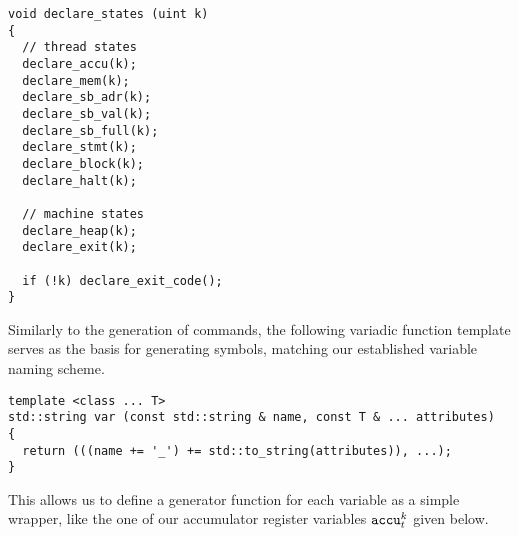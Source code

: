 \begin{lstlisting}[style=c++]
void declare_states (uint k)
{
  // thread states
  declare_accu(k);
  declare_mem(k);
  declare_sb_adr(k);
  declare_sb_val(k);
  declare_sb_full(k);
  declare_stmt(k);
  declare_block(k);
  declare_halt(k);

  // machine states
  declare_heap(k);
  declare_exit(k);

  if (!k) declare_exit_code();
}
\end{lstlisting}


%

\noindent
Similarly to the generation of \SMTLIB commands, the following variadic function template serves as the basis for generating symbols, matching our established variable naming scheme.

\begin{lstlisting}[style=c++]
template <class ... T>
std::string var (const std::string & name, const T & ... attributes)
{
  return (((name += '_') += std::to_string(attributes)), ...);
}
\end{lstlisting}

\noindent
This allows us to define a generator function for each variable as a simple wrapper, %
like the one of our accumulator register variables $\texttt{accu}^k_t$ given below.



